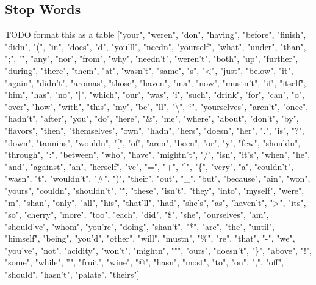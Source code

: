 \documentclass[11pt]{article}
\begin{document}
\subsection{Stop Words}
TODO format this as a table
["your", "weren", "don", "having", "before", "finish", "didn", "(", "in", "does", "d", "you'll", "needn", "yourself", "what", "under", "than", ";", "\~", "any", "nor", "from", "why", "needn't", "weren't", "both", "up", "further", "during", "there", "them", "at", "wasn't", "same", "s", "<", "just", "below", "it", "again", "didn't", "aromas", "those", "haven", "ma", "now", "mustn't", "if", "itself", "him", "has", "no", "|", "which", "our", "was", "i", "such", "drink", "for", "can", "o", "over", "how", "with", "this", "my", "be", "ll", "\textbackslash", "`", "yourselves", "aren't", "once", "hadn't", "after", "you", "do", "here", "\&", "me", "where", "about", "don't", "by", "flavors", "then", "themselves", "own", "hadn", "hers", "doesn", "her", ".", "is", "?", "down", "tannins", "wouldn", "[", "of", "aren", "been", "or", "y", "few", "shouldn", "through", ":", "between", "who", "have", "mightn't", "/", "isn", "it's", "when", "he", "and", "against", "an", "herself", "ve", "=", "+", "]", "\{", "very", "a", "couldn't", "wasn", "t", "wouldn't", "\#", ")", "their", "out", "\_", "but", "because", "ain", "won", "yours", "couldn", "shouldn't", "\^", "these", "isn't", "they", "into", "myself", "were", "m", "shan", "only", "all", "his", "that'll", "had", "she's", "as", "haven't", ">", "its", "so", "cherry", "more", "too", "each", "did", "\$", "she", "ourselves", "am", "should've", "whom", "you're", "doing", "shan't", "*", "are", "the", "until", "himself", "being", "you'd", "other", "will", "mustn", "\%", "re", "that", "-", "we", "you've", "not", "acidity", "won't", "mightn", """, "ours", "doesn't", "\}", "above", "!", "some", "while", "'", "fruit", "wine", "@", "hasn", "most", "to", "on", ",", "off", "should", "hasn't", "palate", "theirs"]
\end{document}
